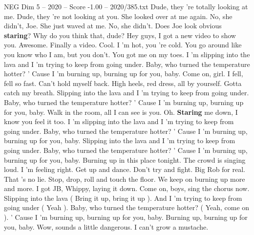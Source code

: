 \begin{textsample}{NEG Dim 5 – 2020 – Score -1.00 – 2020/385.txt}  \label{ex:f5_neg_028}
Dude, they 're totally looking at me.
Dude, they 're not looking at you.
She looked over at me again.
No, she didn't, Joe.
She just waved at me.
No, she didn't.
Does Joe look obvious \textbf{staring}?
Why do you think that, dude?
Hey guys, I got a new video to show you.
Awesome.
Finally a video.
Cool.
I 'm hot, you 're cold.
You go around like you know who I am, but you don't.
You got me on my toes.
I 'm slipping into the lava and I 'm trying to keep from going under.
Baby, who turned the temperature hotter? ' Cause I 'm burning up, burning up for you, baby.
Come on, girl.
I fell, fell so fast.
Can't hold myself back.
High heels, red dress, all by yourself.
Gotta catch my breath.
Slipping into the lava and I 'm trying to keep from going under.
Baby, who turned the temperature hotter? ' Cause I 'm burning up, burning up for you, baby.
Walk in the room, all I can see is you.
Oh. \textbf{Staring} me down, I know you feel it too.
I 'm slipping into the lava and I 'm trying to keep from going under.
Baby, who turned the temperature hotter? ' Cause I 'm burning up, burning up for you, baby.
Slipping into the lava and I 'm trying to keep from going under.
Baby, who turned the temperature hotter? ' Cause I 'm burning up, burning up for you, baby.
Burning up in this place tonight.
The crowd is singing loud.
I 'm feeling right.
Get up and dance.
Don't try and fight.
Big Rob for real.
That 's no lie.
Stop, drop, roll and touch the floor.
We keep on burning up more and more.
I got JB, Whippy, laying it down.
Come on, boys, sing the chorus now.
Slipping into the lava ( Bring it up, bring it up ).
And I 'm trying to keep from going under ( Yeah ).
Baby, who turned the temperature hotter? ( Yeah, come on ). ' Cause I 'm burning up, burning up for you, baby.
Burning up, burning up for you, baby.
Wow, sounds a little dangerous.
I can't grow a mustache.

\end{textsample}
